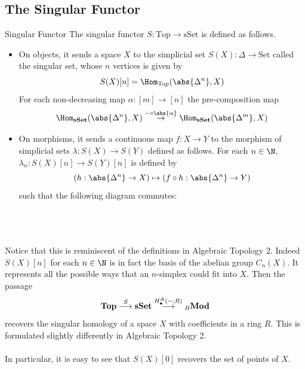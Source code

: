\documentclass[a4paper]{article}
\begin{document}
\subsection{The Singular Functor}
\begin{defn}{Singular Functor}{} The singular functor $S:\text{Top}\to\text{sSet}$ is defined as follows. 
\begin{itemize}
\item On objects, it sends a space $X$ to the simplicial set $S(X):\Delta\to\text{Set}$ called the singular set, whose $n$ vertices is given by $$S(X)[n]=\Hom_{\text{Top}}(\abs{\Delta^n},X)$$ For each non-decreasing map $\alpha:[m]\to[n]$ the pre-composition map $$\Hom_{\bold{sSet}}(\abs{\Delta^n},X)\overset{-\circ\abs{\alpha}}{\rightarrow}\Hom_{\bold{sSet}}(\abs{\Delta^m},X)$$
\item On morphisms, it sends a continuous map $f:X\to Y$ to the morphism of simplicial sets $\lambda:S(X)\to S(Y)$ defined as follows. For each $n\in\N$, $\lambda_n:S(X)[n]\to S(Y)[n]$ is defined by $$\left(h:\abs{\Delta^n}\to X\right)\mapsto\left(f\circ h:\abs{\Delta^n}\to Y\right)$$ such that the following diagram commutes: \\~\\
\\~\\
\end{itemize}
\end{defn}

Notice that this is reminiscent of the definitions in Algebraic Topology 2. Indeed $S(X)[n]$  for each $n\in\N$ is in fact the basis of the abelian group $C_n(X)$. It represents all the possible ways that an $n$-simplex could fit into $X$. Then the passage $$\bold{Top}\overset{S}{\longrightarrow}\bold{sSet}\overset{H_\bullet^\Delta(-;R)}{\longrightarrow}{_R\bold{Mod}}$$ recovers the singular homology of a space $X$ with coefficients in a ring $R$. This is formulated slightly differently in Algebraic Topology 2. \\~\\

In particular, it is easy to see that $S(X)[0]$ recovers the set of points of $X$. 
\end{document}
